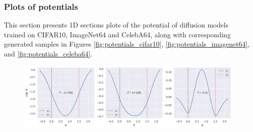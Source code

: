 \clearpage
\subsubsection{Plots of potentials}
\label{sub:plots_plotentials}
This section presents 1D sections plots of the potential of diffusion models trained on CIFAR10, ImageNet64 and CelebA64, along with corresponding generated samples in Figures \ref{fig:potentials_cifar10}, \ref{fig:potentials_imagenet64}, and \ref{fig:potentials_celeba64}.

\begin{figure}[ht!]
\centering
\begin{minipage}[b]{.368\textwidth}
\end{minipage}%
\begin{minipage}[b]{.625\textwidth}
\centering
{} %
\subfloat
  {\includegraphics[width=\textwidth]{figs/plots/potentials_cifar10_avg_20.png}}\vfill

\end{minipage}
\end{figure}
